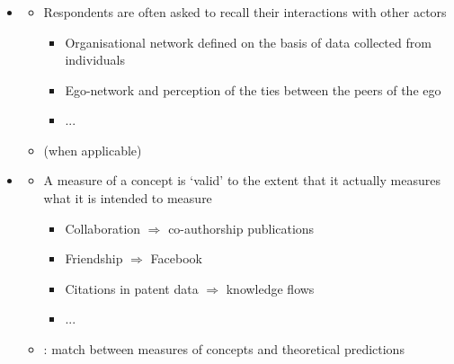 \documentclass[8pt]{beamer}
\begin{document}
\begin{frame}
\frametitle{\insertsection}

\begin{itemize}
\item {\color{blue}{Accuracy}}
    \begin{itemize}
    \item Respondents are often asked to recall their interactions with other actors
        \begin{itemize}
        \item Organisational network defined on the basis of data collected from individuals
        \item Ego-network and perception of the ties between the peers of the ego
        \item ...
        \end{itemize}    
    \item {\color{dkgreen}{Data triangulation}} (when applicable)
    \end{itemize}

\medskip
\medskip


\item {\color{blue}{Validity}} 
    \begin{itemize}
    \item A measure of a concept is `valid' to the extent that it actually measures what it is intended to measure
    
    \begin{itemize}
    \item Collaboration $\Rightarrow$ co-authorship publications
    \item Friendship $\Rightarrow$ Facebook
    \item Citations in patent data $\Rightarrow$ knowledge flows
    \item ... 
    \end{itemize}
    

    \item {\color{dkgreen}{Construct validity}}: match between measures of concepts and theoretical predictions
    \end{itemize}
    
\end{itemize}

\end{frame}

\end{document}
